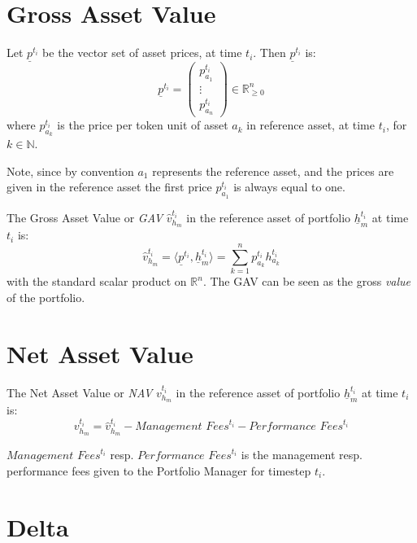 \documentclass[9pt,oneside]{amsart}
\theoremstyle{plain}
\begin{document}
\section{Gross Asset Value}\label{app:defgav}

Let $\underline{p}^{t_i}$ be the vector set of asset prices, at time $t_i$. Then $\underline{p}^{t_i}$ is:
\begin{equation}
	\underline{p}^{t_i} = \begin{pmatrix}p_{a_{1}}^{t_i}\\ \vdots \\ p_{a_{n}}^{t_i}\end{pmatrix} \in \mathbb{R}_{\geq 0}^n
\end{equation}
where $p_{a_{k}}^{t_i}$ is the price per token unit of asset $a_k$ in reference asset, at time $t_i$, for $k \in \mathbb{N}$.

Note, since by convention $a_1$ represents the reference asset, and the prices are given in the reference asset the first price $p_{a_{1}}^{t_i}$ is always equal to one.

The Gross Asset Value or \textit{GAV} $\hat{v}_{h_m}^{t_i}$ in the reference asset of portfolio $\underline{h}_m^{t_i}$ at time $t_i$ is:
\begin{equation}
	\hat{v}_{h_m}^{t_i} = \langle \underline{p}^{t_i}, \underline{h}_m^{t_i}\rangle = \sum_{k=1}^{n} p_{a_{k}}^{t_i}h_{a_{k}}^{t_i}
\end{equation}
with the standard scalar product on $\mathbb{R}^n$. The GAV can be seen as the gross \textit{value} of the portfolio.

\section{Net Asset Value}\label{app:defnav}

The Net Asset Value or \textit{NAV} $v_{h_m}^{t_i}$ in the reference asset of portfolio $\underline{h}_m^{t_i}$ at time $t_i$ is:
\begin{equation}
v_{h_m}^{t_i} = \hat{v}_{h_m}^{t_i} - \textit{Management Fees}^{t_i} - \textit{Performance Fees}^{t_i}
\end{equation}

$\textit{Management Fees}^{t_i}$ resp. $\textit{Performance Fees}^{t_i}$ is the management resp. performance fees given to the Portfolio Manager for timestep $t_i$.

\section{Delta}\label{app:defdelta}
\end{document}

